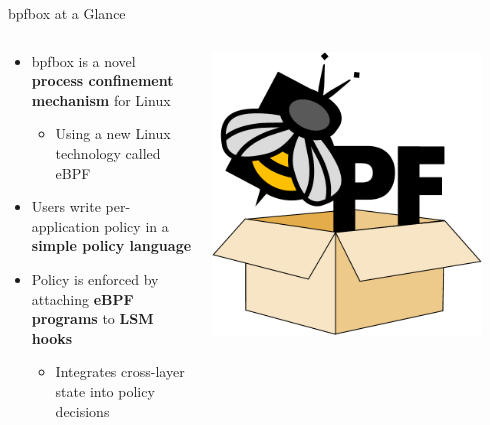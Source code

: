 \documentclass[12pt, dvipsnames]{beamer}
\begin{document}
\begin{frame}[c]{bpfbox at a Glance}
\begin{columns}
    \begin{column}{0.6\textwidth}
        \begin{itemize}
            \item bpfbox is a novel \textbf{process confinement mechanism} for Linux%
            \begin{itemize}
                \item Using a new Linux technology called eBPF
            \end{itemize}
            \vspace{2em}
            \item Users write per-application policy in a \textbf{simple policy language}
            \vspace{2em}
            \item Policy is enforced by attaching \textbf{eBPF programs} to \textbf{LSM hooks}%
            \begin{itemize}
                \item Integrates cross-layer state into policy decisions
            \end{itemize}
        \end{itemize}
    \end{column}
    \begin{column}{0.4\textwidth}
        \begin{center}
            \color{black}
            \includegraphics[width=0.9\textwidth]{figs/bpfbox-logo.pdf}\\
        \end{center}
        \vspace{1em}
    \end{column}
\end{columns}
\end{frame}
\end{document}
